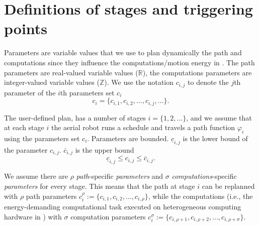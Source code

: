 \section{Definitions of stages and triggering points}
\label{sec:defs-stages-triggs}



Parameters are variable values that we use to plan dynamically the path and computations since they influence the computations/motion energy in . The path parameters are real-valued variable values ($\mathbb{R}$), the computations parameters are integer-valued variable values ($\mathbb{Z}$). We use the notation  $c_{i,j}$ to denote the $j$th parameter of the $i$th parameters set $c_i$
\begin{equation}
  c_i=\{c_{i,1},c_{i,2},\dots,c_{i,j},\dots\}.
\end{equation}

The user-defined plan, has a number of stages $i=\{1,2,\dots\}$, and we assume that at each stage $i$ the aerial robot runs a schedule and travels a path function $\varphi_i$ using the parameters set $c_i$. Parameters are bounded. $\underline{c}_{i,j}$ is the lower bound of the parameter $c_{i,j}$. $\overline{c}_{i,j}$ is the upper bound
\begin{equation}
  \underline{c}_{i,j}\leq c_{i,j}\leq\overline{c}_{i,j}.
\end{equation}

We assume there are $\rho$ \emph{path}-specific \emph{parameters} and $\sigma$ \emph{computations}-specific \emph{parameters} for every stage. This means that the path at stage $i$ can be replanned with $\rho$ path parameters
$c_i^\rho:=\{c_{i,1},c_{i,2},\dots,c_{i,\rho}\}$,
while the computations (i.e., the energy-demanding computational task executed on heterogeneous computing hardware in ) with $\sigma$ computation parameters 
$c_i^\sigma:=\{c_{i,\rho+1},c_{i,\rho+2},\dots,c_{i,\rho+\sigma}\}$.

